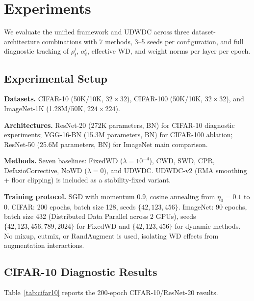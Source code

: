 \documentclass{article}
\begin{document}
\section{Experiments}
\label{sec:experiments}

We evaluate the unified framework and UDWDC across three dataset-architecture combinations with 7 methods, 3--5 seeds per configuration, and full diagnostic tracking of $\rho_t^l$, $\alpha_t^l$, effective WD, and weight norms per layer per epoch.

\subsection{Experimental Setup}

\textbf{Datasets.} CIFAR-10 (50K/10K, $32{\times}32$), CIFAR-100 (50K/10K, $32{\times}32$), and ImageNet-1K (1.28M/50K, $224{\times}224$).

\textbf{Architectures.} ResNet-20 (272K parameters, BN) for CIFAR-10 diagnostic experiments; VGG-16-BN (15.3M parameters, BN) for CIFAR-100 ablation; ResNet-50 (25.6M parameters, BN) for ImageNet main comparison.

\textbf{Methods.} Seven baselines: FixedWD ($\lambda = 10^{-4}$), CWD, SWD, CPR, DefazioCorrective, NoWD ($\lambda = 0$), and UDWDC. UDWDC-v2 (EMA smoothing + floor clipping) is included as a stability-fixed variant.

\textbf{Training protocol.} SGD with momentum 0.9, cosine annealing from $\eta_0 = 0.1$ to 0. CIFAR: 200 epochs, batch size 128, seeds $\{42, 123, 456\}$. ImageNet: 90 epochs, batch size 432 (Distributed Data Parallel across 2 GPUs), seeds $\{42, 123, 456, 789, 2024\}$ for FixedWD and $\{42, 123, 456\}$ for dynamic methods. No mixup, cutmix, or RandAugment is used, isolating WD effects from augmentation interactions.

\subsection{CIFAR-10 Diagnostic Results}

Table~\ref{tab:cifar10} reports the 200-epoch CIFAR-10/ResNet-20 results.
\end{document}
